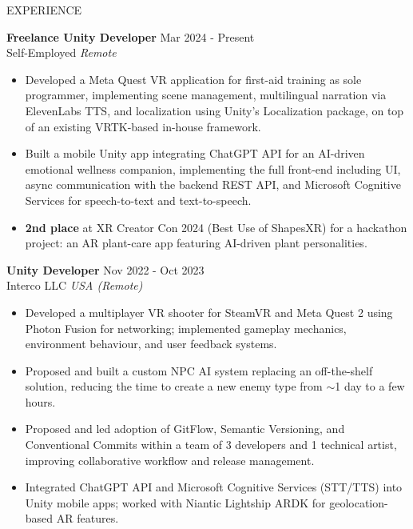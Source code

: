\documentclass{resume} %
\begin{document}

\begin{rSection}{EXPERIENCE}

\textbf{Freelance Unity Developer} \hfill Mar 2024 - Present\\
Self-Employed \hfill \textit{Remote}
 \begin{itemize}
    \itemsep -3pt {}
    \item Developed a Meta Quest VR application for first-aid training as sole programmer, implementing scene management, multilingual narration via ElevenLabs TTS, and localization using Unity's Localization package, on top of an existing VRTK-based in-house framework.
    \item Built a mobile Unity app integrating ChatGPT API for an AI-driven emotional wellness companion, implementing the full front-end including UI, async communication with the backend REST API, and Microsoft Cognitive Services for speech-to-text and text-to-speech.
    \item \textbf{2nd place} at XR Creator Con 2024 (Best Use of ShapesXR) for a hackathon project: an AR plant-care app featuring AI-driven plant personalities.
 \end{itemize}

\textbf{Unity Developer} \hfill Nov 2022 - Oct 2023\\
Interco LLC \hfill \textit{USA (Remote)}
 \begin{itemize}
    \itemsep -3pt {} 
    \item Developed a multiplayer VR shooter for SteamVR and Meta Quest 2 using Photon Fusion for networking; implemented gameplay mechanics, environment behaviour, and user feedback systems.
    \item Proposed and built a custom NPC AI system replacing an off-the-shelf solution, reducing the time to create a new enemy type from $\sim$1 day to a few hours.
    \item Proposed and led adoption of GitFlow, Semantic Versioning, and Conventional Commits within a team of 3 developers and 1 technical artist, improving collaborative workflow and release management.
    \item Integrated ChatGPT API and Microsoft Cognitive Services (STT/TTS) into Unity mobile apps; worked with Niantic Lightship ARDK for geolocation-based AR features.
 \end{itemize}
 

\end{rSection}
\end{document}
